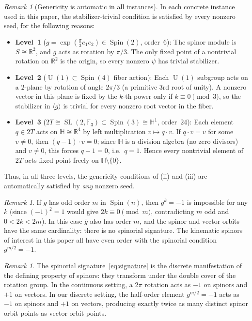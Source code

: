 \documentclass[11pt,reqno]{amsart}
\theoremstyle{plain}
\theoremstyle{definition}
\theoremstyle{remark}
\newtheorem{remark}[theorem]{Remark}
\newcommand{\R}{\mathbb{R}}
\newcommand{\HH}{\mathbb{H}}
\newcommand{\F}{\mathbb{F}}
\DeclareMathOperator{\Spin}{Spin}
\DeclareMathOperator{\U}{U}
\DeclareMathOperator{\SL}{SL}
\begin{document}
\begin{remark}[Genericity is automatic in all instances]
\label{rem:genericity}
In each concrete instance used in this paper, the
stabilizer-trivial condition is satisfied by every
nonzero seed, for the following reasons:
\begin{itemize}
\item \textbf{Level~1} ($g = \exp(\tfrac{\pi}{3} e_1 e_2)
  \in \Spin(2)$, order~$6$):
  The spinor module is $S \cong \R^2$, and $g$ acts as
  rotation by $\pi/3$.
  The only fixed point of a nontrivial rotation on $\R^2$
  is the origin, so every nonzero $\psi$ has trivial
  stabilizer.
\item \textbf{Level~2} ($\U(1) \subset \Spin(4)$
  fiber action):
  Each $\U(1)$ subgroup acts on a $2$-plane by rotation
  of angle $2\pi/3$ (a primitive $3$rd root of unity).
  A nonzero vector in this plane is fixed by the $k$-th
  power only if $k \equiv 0 \pmod{3}$, so the stabilizer
  in $\langle g \rangle$ is trivial for every nonzero
  root vector in the fiber.
\item \textbf{Level~3} ($2T \cong \SL(2,\F_3) \subset
  \Spin(3) \cong \HH^1$, order~$24$):
  Each element $q \in 2T$ acts on $\HH \cong \R^4$ by
  left multiplication $v \mapsto q \cdot v$.
  If $q \cdot v = v$ for some $v \neq 0$, then
  $(q - 1) \cdot v = 0$; since $\HH$ is a division
  algebra (no zero divisors) and $v \neq 0$, this
  forces $q - 1 = 0$, i.e.\ $q = 1$.
  Hence every nontrivial element of $2T$ acts
  fixed-point-freely on $\HH \setminus \{0\}$.
\end{itemize}
Thus, in all three levels, the genericity conditions of
(ii) and (iii) are automatically satisfied by
\emph{any} nonzero seed.
\end{remark}

\begin{remark}
If $g$ has odd order $m$ in $\Spin(n)$, then $g^k = -1$
is impossible for any $k$ (since $(-1)^2 = 1$ would give
$2k \equiv 0 \pmod{m}$, contradicting $m$ odd and $0 < 2k < 2m$).
In this case $\bar{g}$ also has order $m$, and the spinor
and vector orbits have the same cardinality: there is no
spinorial signature.
The kinematic spinors of interest in this paper all have
even order with the spinorial condition $g^{m/2} = -1$.
\end{remark}

\begin{remark}
The spinorial signature~\eqref{eq:signature} is the discrete
manifestation of the defining property of spinors: they
transform under the double cover of the rotation group.
In the continuous setting, a $2\pi$ rotation acts as $-1$ on
spinors and $+1$ on vectors.
In our discrete setting, the half-order element $g^{m/2} = -1$
acts as $-1$ on spinors and $+1$ on vectors, producing
exactly twice as many distinct spinor orbit points as vector
orbit points.
\end{remark}
\end{document}
